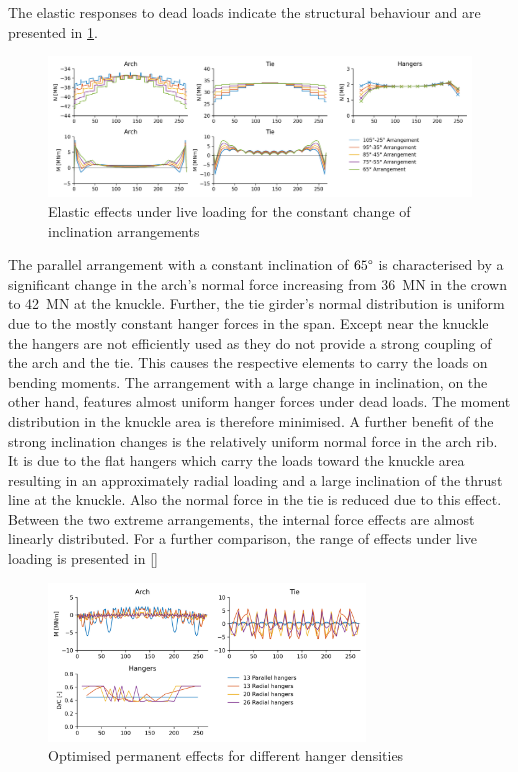 The elastic responses to dead loads indicate the structural behaviour and are presented in \cref{fig:change_live}.

\begin{figure}[H]
    \centering
    \includegraphics[trim={0 0 0 0},clip, width=\textwidth]{calculations/constant change arrangement/dead load.png}
    \caption{Elastic effects under live loading for the constant change of inclination arrangements}
    \label{fig:change_live}
\end{figure}

The parallel arrangement with a constant inclination of $65\degree$ is characterised by a significant change in the arch's normal force increasing from \SI{36}{MN} in the crown to \SI{42}{MN} at the knuckle. Further, the tie girder's normal distribution is uniform due to the mostly constant hanger forces in the span. Except near the knuckle the hangers are not efficiently used as they do not provide a strong coupling of the arch and the tie. This causes the respective elements to carry the loads on bending moments. The arrangement with a large change in inclination, on the other hand, features almost uniform hanger forces under dead loads. The moment distribution in the knuckle area is therefore minimised. A further benefit of the strong inclination changes is the relatively uniform normal force in the arch rib. It is due to the flat hangers which carry the loads toward the knuckle area resulting in an approximately radial loading and a large inclination of the thrust line at the knuckle. Also the normal force in the tie is reduced due to this effect.
Between the two extreme arrangements, the internal force effects are almost linearly distributed. For a further comparison, the range of effects under live loading is presented in \cref{}

\begin{figure}[H]
    \centering
    \includegraphics[trim={0 0 0 0},clip, width=0.75\textwidth]{calculations/hanger density radial/permanent.png}
    \caption{Optimised permanent effects for different hanger densities}
    \label{fig:hd_permanent_radial}
\end{figure}

